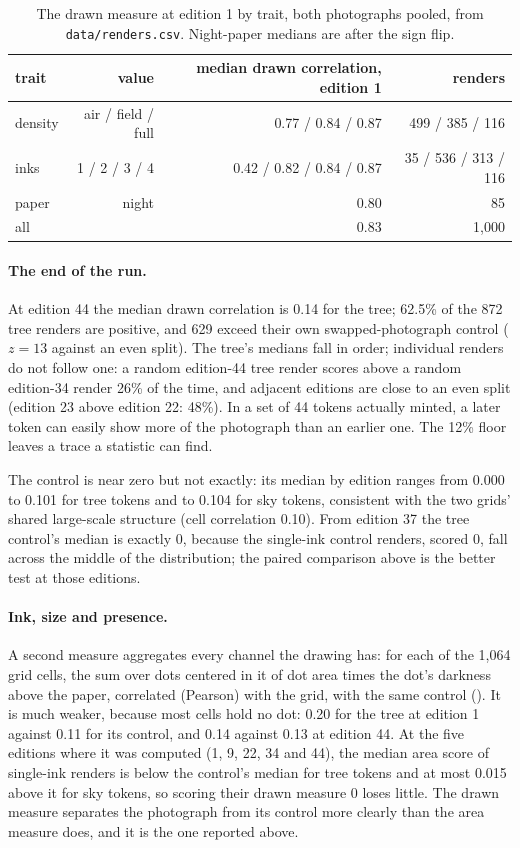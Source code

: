 \documentclass[11pt]{article}
\begin{document}
\begin{table}[t]
  \centering
  \small
  \begin{tabular}{lrrr}
    \toprule
    trait & value & median drawn correlation, edition 1 & renders \\
    \midrule
    density & air / field / full & 0.77 / 0.84 / 0.87 & 499 / 385 / 116 \\
    inks & 1 / 2 / 3 / 4 & 0.42 / 0.82 / 0.84 / 0.87 & 35 / 536 / 313 / 116 \\
    paper & night & 0.80 & 85 \\
    all & & 0.83 & 1{,}000 \\
    \bottomrule
  \end{tabular}
  \caption{The drawn measure at edition 1 by trait, both photographs pooled, from \texttt{data/renders.csv}. Night-paper medians are after the sign flip.}
  \label{tab:traits2}
\end{table}

\paragraph{The end of the run.} At edition 44 the median drawn correlation is 0.14 for the tree; 62.5\% of the 872 tree renders are positive, and 629 exceed their own swapped-photograph control ($z = 13$ against an even split). The tree's medians fall in order; individual renders do not follow one: a random edition-44 tree render scores above a random edition-34 render 26\% of the time, and adjacent editions are close to an even split (edition 23 above edition 22: 48\%). In a set of 44 tokens actually minted, a later token can easily show more of the photograph than an earlier one. The 12\% floor leaves a trace a statistic can find.

The control is near zero but not exactly: its median by edition ranges from 0.000 to 0.101 for tree tokens and to 0.104 for sky tokens, consistent with the two grids' shared large-scale structure (cell correlation 0.10). From edition 37 the tree control's median is exactly 0, because the single-ink control renders, scored 0, fall across the middle of the distribution; the paired comparison above is the better test at those editions.

\paragraph{Ink, size and presence.} A second measure aggregates every channel the drawing has: for each of the 1{,}064 grid cells, the sum over dots centered in it of dot area times the dot's darkness above the paper, correlated (Pearson) with the grid, with the same control (). It is much weaker, because most cells hold no dot: 0.20 for the tree at edition 1 against 0.11 for its control, and 0.14 against 0.13 at edition 44. At the five editions where it was computed (1, 9, 22, 34 and 44), the median area score of single-ink renders is below the control's median for tree tokens and at most 0.015 above it for sky tokens, so scoring their drawn measure 0 loses little. The drawn measure separates the photograph from its control more clearly than the area measure does, and it is the one reported above.
\end{document}
